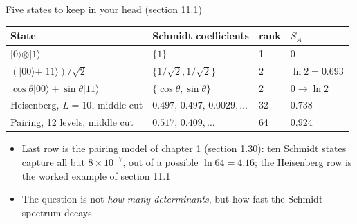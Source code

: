 \documentclass[aspectratio=169,10pt]{beamer}
\newcommand{\ket}[1]{\vert #1\rangle}
\begin{document}
\begin{frame}{Five states to keep in your head (section 11.1)}
  \small
  \begin{center}
  \begin{tabular}{@{}llll@{}}\toprule
  State & Schmidt coefficients & rank & $S_A$\\\midrule
  $\ket0\otimes\ket1$ & $\{1\}$ & 1 & $0$\\
  $(\ket{00}+\ket{11})/\sqrt2$ & $\{1/\sqrt2,1/\sqrt2\}$ & 2 & $\ln2=0.693$\\
  $\cos\theta\ket{00}+\sin\theta\ket{11}$ & $\{\cos\theta,\sin\theta\}$ & 2 & $0\to\ln2$\\
  Heisenberg, $L=10$, middle cut & $0.497,\,0.497,\,0.0029,\dots$ & 32 & $0.738$\\
  Pairing, 12 levels, middle cut & $0.517,\,0.409,\dots$ & 64 & $0.924$\\\bottomrule
  \end{tabular}
  \end{center}
  \vspace{0.8em}
  \begin{itemize}
    \item Last row is the pairing model of chapter 1 (section 1.30): ten Schmidt states capture all but $8\times10^{-7}$, out of a possible $\ln64=4.16$; the Heisenberg row is the worked example of section 11.1
    \item The question is not \emph{how many determinants}, but \alert{how fast the Schmidt spectrum decays}
  \end{itemize}
\end{frame}
\end{document}
